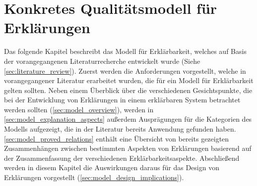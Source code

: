 \chapter{Konkretes Qualitätsmodell für Erklärungen}

Das folgende Kapitel beschreibt das Modell für Erklärbarkeit, welches auf Basis der vorangegangenen Literaturrecherche entwickelt wurde (Siehe \autoref{sec:literature_review}). Zuerst werden die Anforderungen vorgestellt, welche in vorangegangener Literatur erarbeitet wurden, die für ein Modell für Erklärbarkeit gelten sollten. Neben einem Überblick über die verschiedenen Gesichtspunkte, die bei der Entwicklung von Erklärungen in einem erklärbaren System betrachtet werden sollten (\autoref{sec:model_overview}), werden in \autoref{sec:model_explanation_aspects} außerdem Ausprägungen für die Kategorien des Modells aufgezeigt, die in der Literatur bereits Anwendung gefunden haben. \autoref{sec:model_proved_relations} enthält eine Übersicht von bereits gezeigten Zusammenhängen zwischen bestimmten Aspekten von Erklärungen basierend auf der Zusammenfassung der verschiedenen Erklärbarkeitsaspekte. Abschließend werden in diesem Kapitel die Auswirkungen daraus für das Design von Erklärungen vorgestellt (\autoref{sec:model_design_implications}).









